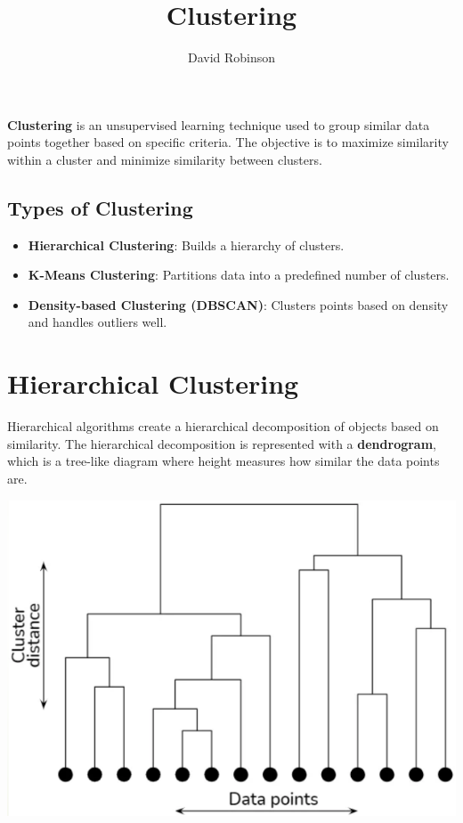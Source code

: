 \documentclass{article}
\title{Clustering}
\author{David Robinson}
\date{}
\begin{document}
\maketitle

\textbf{Clustering} is an unsupervised learning technique used to group similar data points together based on specific criteria. The objective is to maximize similarity within a cluster and minimize similarity between clusters.

\subsection*{Types of Clustering}
\begin{itemize}
    \item \textbf{Hierarchical Clustering}: Builds a hierarchy of clusters.
    \item \textbf{K-Means Clustering}: Partitions data into a predefined number of clusters.
    \item \textbf{Density-based Clustering (DBSCAN)}: Clusters points based on density and handles outliers well.
\end{itemize}

\section*{Hierarchical Clustering}

Hierarchical algorithms create a hierarchical decomposition of objects based on similarity. The hierarchical decomposition is represented with a \textbf{dendrogram}, which is a tree-like diagram where height measures how similar the data points are.

\begin{center}
    \includegraphics[scale=0.5]{dendrogram.png}
\end{center}
\end{document}
